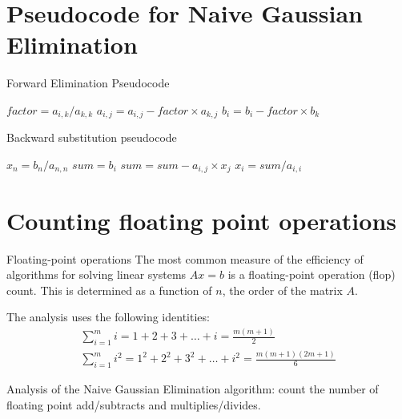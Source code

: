 \documentclass[12pt]{beamer}
\begin{document}
\section{Pseudocode for Naive Gaussian Elimination} 

\begin{frame}{Forward Elimination Pseudocode}
\begin{algorithm}[H]
\begin{algorithmic}[1]
\STATE $factor = a_{i,k} / a_{k,k}$
\STATE $a_{i,j} = a_{i,j} - factor \times a_{k,j}$
\ENDFOR 
\STATE $b_i = b_i - factor \times b_k$
\ENDFOR
\ENDFOR
\end{algorithmic}
\caption{pseudocode for the calculation of forward elimination}
\label{alg:seq}
\end{algorithm}

\end{frame} 


\begin{frame}{Backward substitution pseudocode} 
\begin{algorithm}[H]
\begin{algorithmic}[1]
\STATE $x_n = b_n / a_{n,n}$
\STATE $sum = b_i$
\STATE $sum = sum - a_{i,j} \times x_j$
\ENDFOR 
\STATE $x_i = sum / a_{i,i}$ 
\ENDFOR
\end{algorithmic}
\caption{pseudocode for the calculation of back substitution}
\label{alg:seq}
\end{algorithm}

\end{frame} 

\section{Counting floating point operations} 

\begin{frame}{Floating-point operations}
The most common measure of the efficiency of algorithms for solving
linear systems $Ax =b$ is a floating-point operation (flop)
count. This is determined as a function of $n$, the order of the matrix
$A$.

The analysis uses the following identities: 
\begin{align*} 
\sum_{i=1}^{m} i = 1 + 2 + 3 + \dots + i = \frac{m(m+1)}{2} \\ 
\sum_{i=1}^{m} i^2 = 1^2 + 2^2 + 3^2 + \dots + i^2 = \frac{m(m+1)(2m+1)}{6}
\end{align*} 

Analysis of the Naive Gaussian Elimination algorithm: count the number
of floating point add/subtracts and multiplies/divides.
\end{frame}
\end{document}
